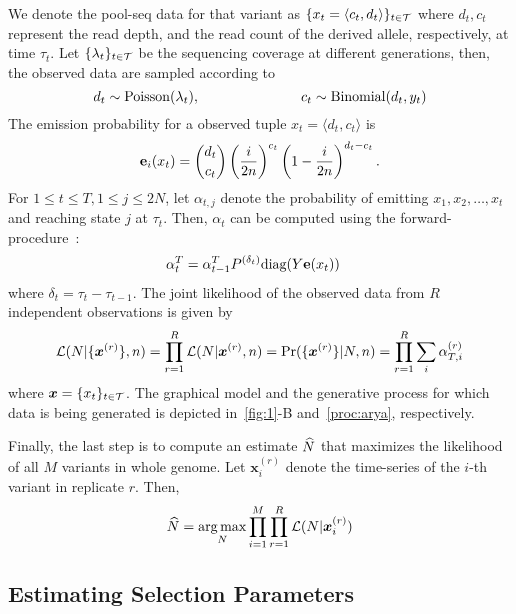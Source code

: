 We denote the pool-seq data for that variant as $\{x_t = \langle
c_t,d_t \rangle\}_{t\in{\cal T}}$ where $d_t, c_t$ represent the read
depth, and the read count of the derived allele, respectively, at time
$\tau_t$. Let $\{\lambda_t\}_{t\in{\cal T}}$ be the sequencing coverage at
different generations, then, the observed data are sampled according
to 
\begin{equation} d_t \sim \operatorname{Poisson}(\lambda_t), \hspace{1in} c_t \sim
\operatorname{Binomial}(d_t,y_t) 
\end{equation}
The emission probability for a observed tuple $x_t=\langle d_t,
c_t\rangle $ is 
\begin{equation} {\bf e}_{i}(x_t) = {d_t \choose c_t}
\left(\frac{i}{2n} \right)^{c_t}\left (1- \frac{i}{2n}
\right)^{d_t-c_t} .  
\end{equation}
For $1\le t\le T, 1\le j\le 2N$, let $\alpha_{t,j}$ denote the
probability of emitting $x_1,x_2,\ldots,x_t$ and reaching state $j$ at
$\tau_t$. Then, $\alpha_{t}$ can be computed using the
forward-procedure~\cite{durbin1998biological}:
\begin{align}
	\alpha_t^T&=\alpha_{t-1}^T P^{(\delta_t)}\text{diag}(Y{\mathbf e}(x_t))
	\label{eq:hmm}
\end{align}
where $\delta_t=\tau_t-\tau_{t-1}$. The joint likelihood of the
observed data from $R$ independent observations is given by
\begin{equation}
{\cal L}(N|\{\bm{x}^{(r)}\}, 
n)=\prod_{r=1}^R{\cal L}(N|\bm{x}^{(r)},n)=\operatorname{Pr}(\{\bm{x}^{(r)}\}|N,n) =	
	\prod_{r=1}^R \sum_i\alpha_{T,i}^{(r)}
	\label{eq:hmmlik}
\end{equation}
where $\bm{x}=\{x_t\}_{t\in {\cal T}}$. The graphical model and the generative 
process for which data is being generated is depicted in~\ref{fig:1}-B 
and~\ref{proc:arya}, respectively.

Finally, the last step is to compute an estimate $\widehat{N}$ that maximizes
the likelihood of all $M$ variants in whole genome. Let
$\bm{x}_i^{(r)}$ denote the time-series of the $i$-th variant in
replicate $r$. Then,
\begin{equation}
 \widehat{N} =
\underset{N}{\arg \max} \prod_{i=1}^M  \prod_{r=1}^R{\cal L}(N|\bm{x}_i^{(r)})
\label{eq:mlen}
\end{equation}

\subsection{Estimating Selection Parameters}

